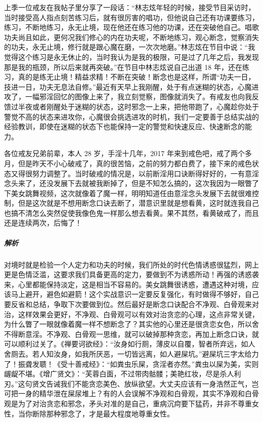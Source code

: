 \begin{case}[不是口诀没用]
    上季一位戒友在我帖子里分享了一段话：“林志炫年轻的时候，接受节目采访时，当时接受高人指点刻苦练习后，就有很厉害的唱功，但他说自己还有功课要练习，练习，不断地练习，永无止境，现在他还在练习他的功课，还在突破他自己。唱歌功夫尚且如此，更何况我们修心的内在功夫呢，不断地练习，观心断念，觉察消失的功夫，永无止境，修行就是跟心魔在磨，一次次地磨。”林志炫在节目中说：“我觉得这个练习是永无休止的，当时我认为是我的极限，可是过了几年之后，我发现那是我的瓶颈，所以后来就再突破。”在节目中林志炫说自己出道 18 年，还在练习，真的是练无止境！精益求精！不断在突破！断念也是这样，所谓“功夫一日，技进一日，功夫无息法自修。”最近有天早上我刚醒，处于有点迷糊的状态，心魔进攻了，一幅邪淫回忆的图像上来了，我立刻觉察，图像就消失了。有戒友也向我反馈过半夜或者刚醒处于迷糊的状态，这时邪念一上来，把他带跑了，心魔趁你处于警觉不高的状态来进攻你，心魔很会挑选进攻的时机，我们一定要善于总结实战的经验教训，即使在迷糊的状态下也能保持一定的警觉和快速反应、快速断念的能力。
\end{case}

\begin{case}
    各位戒友兄弟前辈，本人 28 岁，手淫十几年，2017 年来到戒色吧，戒了两个多月，但是昨天不小心破戒了，真的很苦恼，之前的努力都白费了，接下来的戒色状态又得很努力调整了。当时破戒的情况是，以前断淫用口诀断得好好的，一有意淫念头来了，还没发展下去就被我断掉了，但是不知怎么搞的，这次我因为一眼瞥了下美女跳舞视频，这次就像着了魔一样，明明知道任由意淫念头发展下去就很难控制，但是这次就是不想用断念口诀去断了，潜意识里就是想看黄，这时就连我自己也搞不清怎么突然促使我像色鬼一样那么想去看黄。果不其然，看黄破戒了，而且还是连续两次，后悔了！
    \subparagraph{解析} 对境时就是检验一个人定力和功夫的时候，我们所处的时代色情诱惑很猛烈，网上更是色情泛滥，这要求我们具备更高的定力，要做到不为诱惑所动！再强的诱惑袭来，心里都能保持淡定，这是相当不容易的。美女跳舞很诱惑，遭遇这种对境，应该马上避开，避色如避箭！这个实战意识一定要反复强化，有时做得不够好，自己要反省和总结，争取下次要做到位。然后最好是断念口诀配合不净观、白骨观来对治，这样效果会更好，不净观、白骨观可以有效对治贪恋的心理，这点非常关键，为什么瞥了一眼就像着魔一样不想断念了？其实他的心里还是很贪恋女色，所以舍不得断意淫。不净观、白骨观一思维，就可以破掉那种贪恋，再加上断念口诀，就可以顺利过关了。《禅要诃欲经》：“汝身如行厕，薄皮以自覆，智者所弃远，如人舍厕去。若人知汝身，如我所厌恶，一切皆远离，如人避屎坑。”避屎坑三字太给力了！振聋发聩！《受十善戒经》：“如粪虫乐屎，贪淫者亦然。”粪虫以屎为美，实则龌龊不堪。《增广贤文》：“芙蓉白面，不过带肉骷髅；美艳红妆，尽是杀人利刃。”这句贤文告诫我们不能贪恋美色、放纵欲望。大丈夫应该有一身浩然正气，岂可把一身的精华泄在屎尿堆上？有的人会误解不净观和白骨观，其实不净观和白骨观是为了对治贪恋和邪念，矛头对准的是自己，重病沉疴要下猛药，并非不尊重女性，当你断除那种邪念了，才是最大程度地尊重女性。
\end{case}

